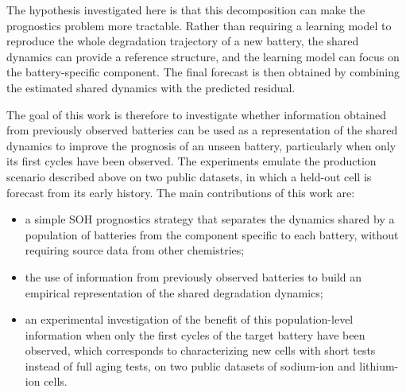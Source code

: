 \documentclass[conference]{IEEEtran}
\begin{document}
The hypothesis investigated here is that this decomposition can make the prognostics problem more tractable. Rather than requiring a learning model to reproduce the whole degradation trajectory of a new battery, the shared dynamics can provide a reference structure, and the learning model can focus on the battery-specific component. The final forecast is then obtained by combining the estimated shared dynamics with the predicted residual.

The goal of this work is therefore to investigate whether information obtained from previously observed batteries can be used as a representation of the shared dynamics to improve the prognosis of an unseen battery, particularly when only its first cycles have been observed. The experiments emulate the production scenario described above on two public datasets, in which a held-out cell is forecast from its early history.
  The main contributions of this work are:

\begin{itemize}
    \item a simple SOH prognostics strategy that separates the dynamics shared by a population of batteries from the component specific to each battery, without requiring source data from other chemistries;

    \item the use of information from previously observed batteries to build an empirical representation of the shared degradation dynamics;

    \item an experimental investigation of the benefit of this population-level information when only the first cycles of the target battery have been observed, which corresponds to characterizing new cells with short tests instead of full aging tests, on two public datasets of sodium-ion and lithium-ion cells.

\end{itemize}

\end{document}
